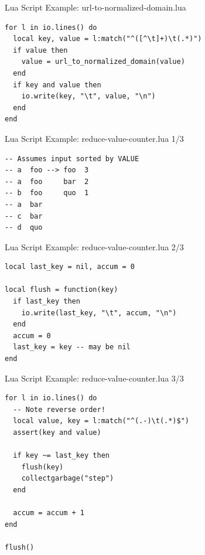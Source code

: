 \documentclass[handout]{beamer}
\begin{document}

\begin{frame}[fragile]{Lua Script Example: url-to-normalized-domain.lua}

\begin{verbatim}
for l in io.lines() do
  local key, value = l:match("^([^\t]+)\t(.*)")
  if value then
    value = url_to_normalized_domain(value)
  end
  if key and value then
    io.write(key, "\t", value, "\n")
  end
end
\end{verbatim}

\end{frame}


\begin{frame}[fragile]{Lua Script Example: reduce-value-counter.lua 1/3}

\begin{verbatim}
-- Assumes input sorted by VALUE
-- a  foo --> foo  3
-- a  foo     bar  2
-- b  foo     quo  1
-- a  bar
-- c  bar
-- d  quo
\end{verbatim}

\end{frame}


\begin{frame}[fragile]{Lua Script Example: reduce-value-counter.lua 2/3}

\begin{verbatim}
local last_key = nil, accum = 0

local flush = function(key)
  if last_key then
    io.write(last_key, "\t", accum, "\n")
  end
  accum = 0
  last_key = key -- may be nil
end
\end{verbatim}

\end{frame}


\begin{frame}[fragile]{Lua Script Example: reduce-value-counter.lua 3/3}

\begin{verbatim}
for l in io.lines() do
  -- Note reverse order!
  local value, key = l:match("^(.-)\t(.*)$")
  assert(key and value)

  if key ~= last_key then
    flush(key)
    collectgarbage("step")
  end

  accum = accum + 1
end

flush()
\end{verbatim}

\end{frame}
\end{document}

